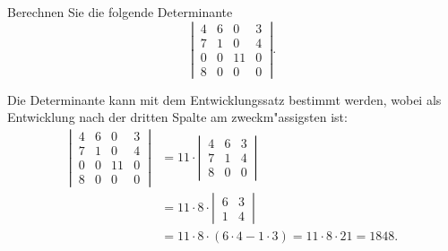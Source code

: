 Berechnen Sie die folgende Determinante
\[
\left|\,\begin{matrix}
4&6& 0&3\\
7&1& 0&4\\
0&0&11&0\\
8&0& 0&0
\end{matrix}\,\right|.
\]


\begin{loesung}
Die Determinante kann mit dem Entwicklungssatz bestimmt werden, wobei
als Entwicklung nach der dritten Spalte am zweckm"assigsten ist:
\begin{align*}
\left|\,\begin{matrix}
4&6& 0&3\\
7&1& 0&4\\
0&0&11&0\\
8&0& 0&0
\end{matrix}\,\right|
&=
11\cdot
\left|\,\begin{matrix}
4&6&3\\
7&1&4\\
8&0&0
\end{matrix}\,\right|
\\
&=
11\cdot
8\cdot
\left|\,\begin{matrix}
6&3\\
1&4
\end{matrix}\,\right|
\\
&=
11\cdot
8\cdot
(6\cdot 4-1\cdot 3)=11\cdot 8\cdot 21=1848.
\end{align*}



\end{loesung}
